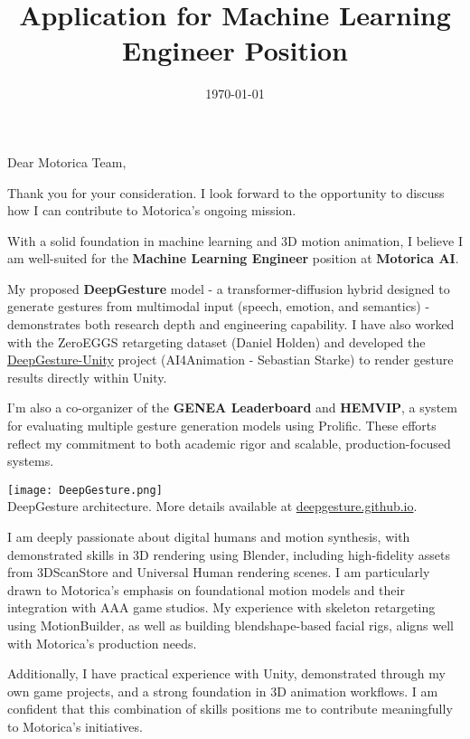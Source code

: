 \documentclass[11pt,a4paper,roman]{moderncv}
\title{Application for Machine Learning Engineer Position}
\begin{document}
	
	\date{\today}
	\opening{Dear Motorica Team,}
	\closing{Thank you for your consideration. I look forward to the opportunity to discuss how I can contribute to Motorica's ongoing mission.}
	\makelettertitle
	
	With a solid foundation in machine learning and 3D motion animation, I believe I am well-suited for the \textbf{Machine Learning Engineer} position at \textbf{Motorica AI}.
	
	My proposed \textbf{DeepGesture} model - a transformer-diffusion hybrid designed to generate gestures from multimodal input (speech, emotion, and semantics) - demonstrates both research depth and engineering capability. I have also worked with the ZeroEGGS retargeting dataset (Daniel Holden) and developed the \href{https://github.com/DeepGesture/DeepGesture-Unity}{DeepGesture-Unity} project (AI4Animation - Sebastian Starke) to render gesture results directly within Unity.
	
	I'm also a co-organizer of the \textbf{GENEA Leaderboard} and \textbf{HEMVIP}, a system for evaluating multiple gesture generation models using Prolific. These efforts reflect my commitment to both academic rigor and scalable, production-focused systems.
	
	\begin{center}
		\texttt{[image: DeepGesture.png]} \\
		\small DeepGesture architecture. More details available at \href{https://deepgesture.github.io}{deepgesture.github.io}.
	\end{center}
	
	I am deeply passionate about digital humans and motion synthesis, with demonstrated skills in 3D rendering using Blender, including high-fidelity assets from 3DScanStore and Universal Human rendering scenes. I am particularly drawn to Motorica’s emphasis on foundational motion models and their integration with AAA game studios. My experience with skeleton retargeting using MotionBuilder, as well as building blendshape-based facial rigs, aligns well with Motorica’s production needs.
	
	Additionally, I have practical experience with Unity, demonstrated through my own game projects, and a strong foundation in 3D animation workflows. I am confident that this combination of skills positions me to contribute meaningfully to Motorica’s initiatives.
	
	
	\makeletterclosing
	
\end{document}
